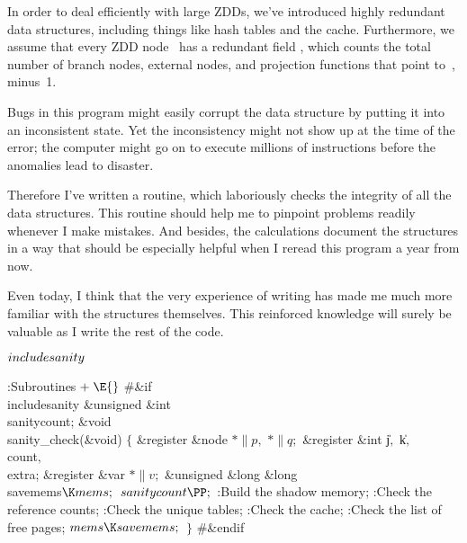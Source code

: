 In order to deal efficiently with large ZDDs, we've introduced highly
redundant data structures, including things like hash tables and the cache.
Furthermore, we assume that every ZDD node~ has a redundant field
, which counts the total number of branch nodes, external
nodes,
and projection functions that point to~, minus~1.

Bugs in this program might easily corrupt the data structure by putting it
into an inconsistent state. Yet the inconsistency might not show up at the
time of the error; the computer might go on to execute millions of
instructions before the anomalies lead to disaster.

Therefore I've written a  routine, which laboriously
checks the
integrity of all the data structures. This routine should help me to pinpoint
problems readily whenever I make mistakes. And besides, the 
calculations document the structures in a way that should be especially
helpful when I reread this program a year from now.

Even today, I think that the very experience of writing 
has
made me much more familiar with the structures themselves. This reinforced
knowledge will surely be valuable as I write the rest of the code.

\Y\B\4\D$\\{includesanity}$ \5
\par
\Y\B\4:Subroutines\X${}\mathrel+\E{}$\6
\8\#\&{if} \\{includesanity}\6
\&{unsigned} \&{int} \\{sanitycount};\7
\&{void} \\{sanity\_check}(\&{void})\1\1\2\2\6
${}\{{}$\1\6
\&{register} \&{node} ${}{*}\|p,{}$ ${}{*}\|q;{}$\6
\&{register} \&{int} \|j${},{}$ \|k${},{}$ \\{count}${},{}$ \\{extra};\6
\&{register} \&{var} ${}{*}\|v;{}$\6
\&{unsigned} \&{long} \&{long} \\{savemems}${}\K\\{mems};{}$\7
${}\\{sanitycount}\PP;{}$\6
:Build the shadow memory\X;\6
:Check the reference counts\X;\6
:Check the unique tables\X;\6
:Check the cache\X;\6
:Check the list of free pages\X;\6
${}\\{mems}\K\\{savemems};{}$\6
\4${}\}{}$\2\6
\8\#\&{endif}\par
\fi

